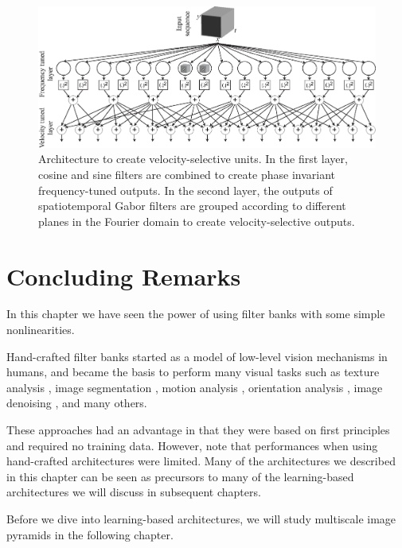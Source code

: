 \begin{figure}[t]
	\centerline{
		\includegraphics[width=1\linewidth]{figures/temporal_filters/MT_velocity_tuned.eps}
	}
	\caption{Architecture to create velocity-selective units. In the first layer, cosine and sine filters are combined to create phase invariant frequency-tuned outputs. In the second layer, the outputs of spatiotemporal Gabor filters are grouped according to different planes in the Fourier domain to create velocity-selective outputs. }
	\label{fig:MT_velocity_tuned}
\end{figure}







\section{Concluding Remarks}

In this chapter we have seen the power of using filter banks with some simple nonlinearities.

Hand-crafted filter banks started as a model of low-level vision mechanisms in humans, and became the basis to perform many visual tasks such as texture analysis \cite{RG:Heeger-Bergen95}, image segmentation \cite{Perona91}, motion analysis \cite{Heeger92}, orientation analysis \cite{Freeman90c}, image denoising \cite{Simoncelli96}, and many others.

These approaches had an advantage in that they were based on first principles and required no training data. However, note that performances when using hand-crafted architectures were limited. Many of the architectures we described in this chapter can be seen as precursors to many of the learning-based architectures we will discuss in subsequent chapters.

Before we dive into learning-based architectures, we will study multiscale image pyramids in the following chapter.


